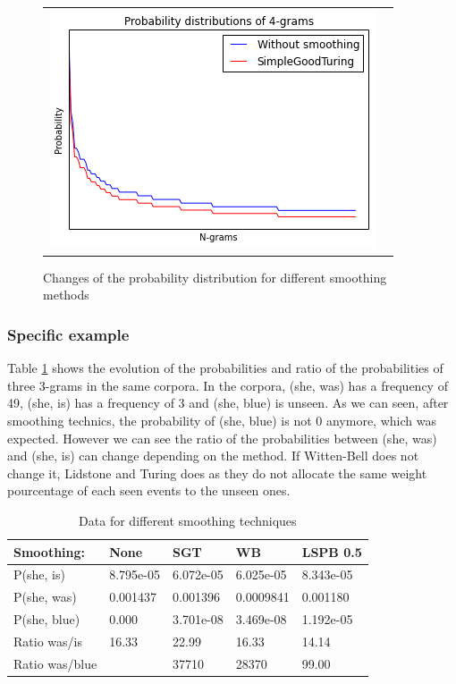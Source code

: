 \documentclass[a4paper,12pt]{article}
\begin{document}
\begin{figure}
\begin{tabular}{cc}
		\includegraphics[width=0.52\linewidth]{4_Turing} \\
	\end{tabular}
	\caption{Changes of the probability distribution for different smoothing methods}
\end{figure}

\subsubsection{Specific example}
	Table \ref{tab:smoothingprobs} shows the evolution of the probabilities and ratio of the probabilities of three 3-grams in the same corpora. In the corpora, (she, was) has a frequency of 49, (she, is) has a frequency of 3 and (she, blue) is unseen. As we can seen, after smoothing technics, the probability of (she, blue) is not 0 anymore, which was expected. However we can see the ratio of the probabilities between (she, was) and (she, is) can change depending on the method. If Witten-Bell does not change it, Lidstone and Turing does as they do not allocate the same weight pourcentage of each seen events to the unseen ones.


\begin{table}[!h]
\centering
\caption{Data for different smoothing techniques}
\label{tab:smoothingprobs}
\begin{tabular}{@{}lllll@{}}
\toprule
Smoothing:     & None      & SGT       & WB        & LSPB 0.5   \\ \midrule
P(she, is)     & 8.795e-05 & 6.072e-05 & 6.025e-05 & 8.343e-05  \\
P(she, was)    & 0.001437  & 0.001396  & 0.0009841 & 0.001180   \\
P(she, blue)   & 0.000     & 3.701e-08 & 3.469e-08 & 1.192e-05  \\
Ratio was/is   & 16.33     & 22.99     & 16.33     & 14.14      \\
Ratio was/blue &           & 37710     & 28370     & 99.00      \\ \bottomrule
\end{tabular}
\end{table}
\end{document}
